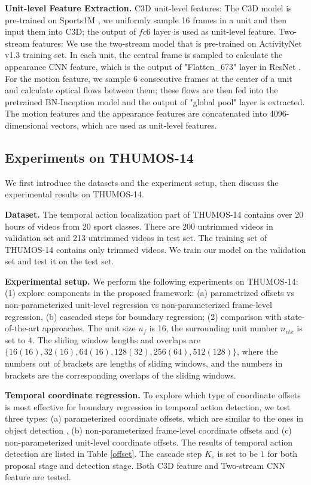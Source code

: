 \documentclass{bmvc2k}
\begin{document}
\textbf{Unit-level Feature Extraction.} C3D unit-level features: The C3D model is pre-trained on Sports1M \cite{Karpathy_2014_CVPR}, we uniformly sample 16 frames in a unit and then input them into C3D; the output of $fc$6 layer is used as unit-level feature. Two-stream features: We use the two-stream model \cite{xiong2016cuhk} that is pre-trained on ActivityNet v1.3 training set. In each unit, the central frame is sampled to calculate the appearance CNN feature, which is the output of  "Flatten\_673" layer in ResNet \cite{he2016deep}. For the motion feature, we sample $6$ consecutive frames at the center of a unit and calculate optical flows \cite{farneback2003two} between them; these flows are then fed into the pretrained BN-Inception model \cite{xiong2016cuhk,ioffe2015batch} and the output of "global pool" layer is extracted. The motion features and the appearance features are concatenated into 4096-dimensional vectors, which are used as unit-level features.

\subsection{Experiments on THUMOS-14}
We first introduce the datasets and the experiment setup, then discuss the experimental results on THUMOS-14.

\textbf{Dataset.} The temporal action localization part of THUMOS-14 contains over 20 hours of videos from 20 sport classes. There are 200 untrimmed videos in validation set and 213 untrimmed  videos in test set. The training set of THUMOS-14 contains only trimmed videos. We train our model on the validation set and test it on the test set.

\textbf{Experimental setup.} We perform the following experiments on THUMOS-14: (1) explore components in the proposed framework: (a) parametrized offsets vs non-parameterized unit-level regression vs non-parameterized frame-level regression, (b) cascaded steps for boundary regression; (2) comparison with state-of-the-art approaches. The unit size $u_f$ is 16, the surrounding unit number $n_{ctx}$ is set to 4. The sliding window lengths and overlaps are $\{16(16),32(16),64(16),128(32),256(64),512(128)\}$, where the numbers out of brackets are lengths of sliding windows, and the numbers in brackets are the corresponding overlaps of the sliding windows.


\textbf{Temporal coordinate regression.}
To explore which type of coordinate offsets is most effective for boundary regression in temporal action detection, we test three types: (a) parameterized coordinate offsets, which are similar to the ones in object detection \cite{ren2015faster}, (b) non-parameterized frame-level coordinate offsets and (c) non-parameterized unit-level coordinate offsets. The results of temporal action detection are listed in Table \ref{offset}. The cascade step $K_c$ is set to be $1$ for both proposal stage and detection stage. Both C3D feature and Two-stream CNN feature are tested. 
\end{document}
